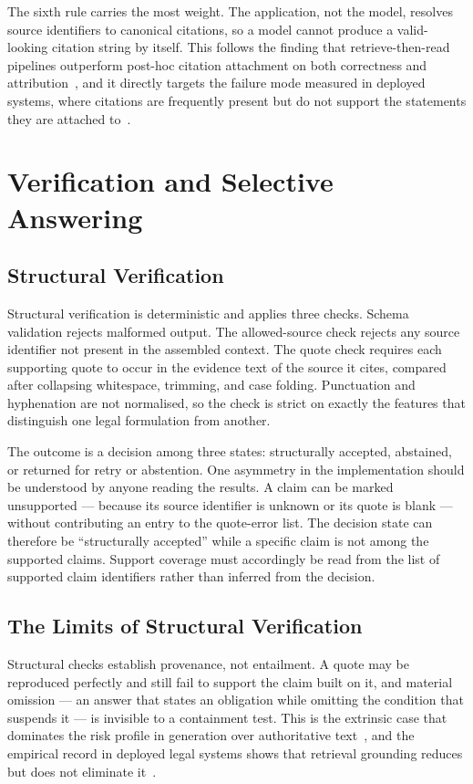 The sixth rule carries the most weight. The application, not the model, resolves source identifiers to canonical citations, so a model cannot produce a valid-looking citation string by itself. This follows the finding that retrieve-then-read pipelines outperform post-hoc citation attachment on both correctness and attribution~\cite{bohnet2022attributed}, and it directly targets the failure mode measured in deployed systems, where citations are frequently present but do not support the statements they are attached to~\cite{liu2023verifiability}.

\section{Verification and Selective Answering}
\label{sec:method-verify}

\subsection{Structural Verification}

Structural verification is deterministic and applies three checks. Schema validation rejects malformed output. The allowed-source check rejects any source identifier not present in the assembled context. The quote check requires each supporting quote to occur in the evidence text of the source it cites, compared after collapsing whitespace, trimming, and case folding. Punctuation and hyphenation are not normalised, so the check is strict on exactly the features that distinguish one legal formulation from another.

The outcome is a decision among three states: structurally accepted, abstained, or returned for retry or abstention. One asymmetry in the implementation should be understood by anyone reading the results. A claim can be marked unsupported --- because its source identifier is unknown or its quote is blank --- without contributing an entry to the quote-error list. The decision state can therefore be ``structurally accepted'' while a specific claim is not among the supported claims. Support coverage must accordingly be read from the list of supported claim identifiers rather than inferred from the decision.

\subsection{The Limits of Structural Verification}

Structural checks establish provenance, not entailment. A quote may be reproduced perfectly and still fail to support the claim built on it, and material omission --- an answer that states an obligation while omitting the condition that suspends it --- is invisible to a containment test. This is the extrinsic case that dominates the risk profile in generation over authoritative text~\cite{ji2023hallucination}, and the empirical record in deployed legal systems shows that retrieval grounding reduces but does not eliminate it~\cite{magesh2025hallucination}.

